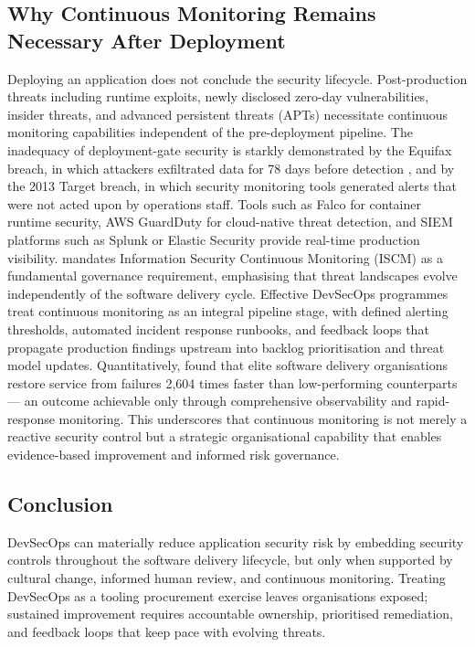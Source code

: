 \documentclass[12pt,a4paper]{article}
\begin{document}
\subsection*{Why Continuous Monitoring Remains Necessary After Deployment}

Deploying an application does not conclude the security lifecycle. Post-production threats
including runtime exploits, newly disclosed zero-day vulnerabilities, insider threats, and
advanced persistent threats (APTs) necessitate continuous monitoring capabilities
independent of the pre-deployment pipeline. The inadequacy of deployment-gate security is
starkly demonstrated by the Equifax breach, in which attackers exfiltrated data for 78 days
before detection \citep{ftc2019}, and by the 2013 Target breach, in which security
monitoring tools generated alerts that were not acted upon by operations staff. Tools such
as Falco for container runtime security, AWS GuardDuty for cloud-native threat detection,
and SIEM platforms such as Splunk or Elastic Security provide real-time production
visibility. \citet{nist800137} mandates Information Security Continuous Monitoring (ISCM)
as a fundamental governance requirement, emphasising that threat landscapes evolve
independently of the software delivery cycle. Effective DevSecOps programmes treat
continuous monitoring as an integral pipeline stage, with defined alerting thresholds,
automated incident response runbooks, and feedback loops that propagate production findings
upstream into backlog prioritisation and threat model updates. Quantitatively,
\citet{forsgren2018} found that elite software delivery organisations restore service from
failures 2,604 times faster than low-performing counterparts --- an outcome achievable only
through comprehensive observability and rapid-response monitoring. This underscores that
continuous monitoring is not merely a reactive security control but a strategic organisational
capability that enables evidence-based improvement and informed risk governance.

\subsection*{Conclusion}

DevSecOps can materially reduce application security risk by embedding security controls
throughout the software delivery lifecycle, but only when supported by cultural change,
informed human review, and continuous monitoring. Treating DevSecOps as a tooling
procurement exercise leaves organisations exposed; sustained improvement requires
accountable ownership, prioritised remediation, and feedback loops that keep pace with
evolving threats.
\end{document}
